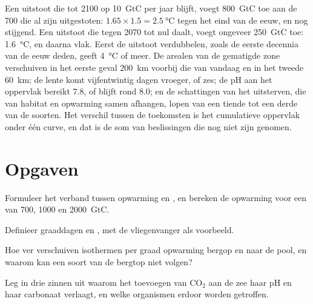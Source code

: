 \begin{example}\label{ex:b2:global-change:scenarios}
Een uitstoot die tot 2100 op \qty{10}{GtC} per jaar blijft, voegt \qty{800}{GtC}
toe aan de \qty{700}{} die al zijn uitgestoten: $1.65\times 1.5 =
\qty{2.5}{\celsius}$ tegen het eind van de eeuw, en nog stijgend. Een uitstoot
die tegen 2070 tot nul daalt, voegt ongeveer \qty{250}{GtC} toe: \qty{1.6}{\celsius},
en daarna vlak. Eerst de uitstoot verdubbelen, zoals de eerste decennia van de
eeuw deden, geeft \qty{4}{\celsius} of meer. De arealen van de
gematigde zone verschuiven in het eerste geval \qty{200}{km} voorbij die van vandaag
en in het tweede \qty{60}{km}; de lente komt vijfentwintig
dagen vroeger, of zes; de pH aan het oppervlak bereikt $7.8$, of blijft rond
$8.0$; en de schattingen van het uitsterven, die van habitat en
opwarming samen afhangen, lopen van een tiende tot een derde van de soorten. Het
verschil tussen de toekomsten is het cumulatieve oppervlak onder één
curve, en dat is de som van beslissingen die nog niet zijn genomen.
\end{example}

\section{Opgaven}

\begin{exercise}[$\star$]\label{exo:b2:global-change:1}
Formuleer het verband tussen opwarming en , en
bereken de opwarming voor een  van 700, 1000 en
\qty{2000}{GtC}.
\end{exercise}

\begin{exercise}[$\star$]\label{exo:b2:global-change:2}
Definieer graaddagen en , met de vliegenvanger
als voorbeeld.
\end{exercise}

\begin{exercise}[$\star$]\label{exo:b2:global-change:3}
Hoe ver verschuiven isothermen per graad opwarming bergop en naar de pool,
en waarom kan een soort van de bergtop niet volgen?
\end{exercise}

\begin{exercise}[$\star$]\label{exo:b2:global-change:4}
Leg in drie zinnen uit waarom het toevoegen van \ensuremath{\mathrm{CO_2}} aan de zee
haar pH en haar carbonaat verlaagt, en welke organismen erdoor worden getroffen.
\end{exercise}

